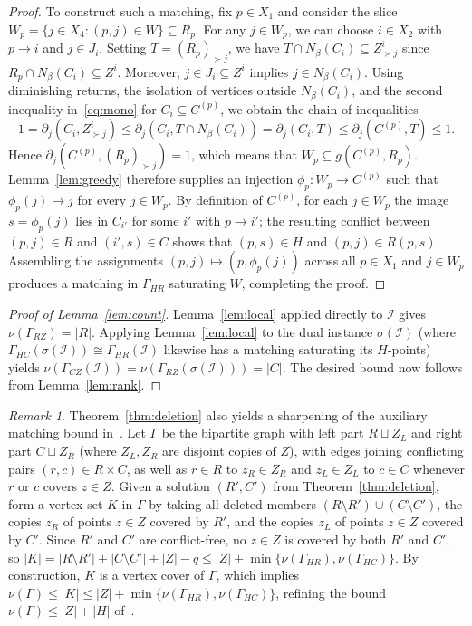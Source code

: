 \documentclass[11pt]{amsart}
\theoremstyle{remark}
\newtheorem{remark}[theorem]{Remark}
\newcommand{\abs}[1]{\lvert #1\rvert}
\begin{document}
\begin{proof}
To construct such a matching, fix $p\in X_1$ and consider the slice $W_p=\{j\in X_4:(p,j)\in W\}\subseteq R_p$. For any $j\in W_p$, we can choose $i\in X_2$ with $p\to i$ and $j\in J_i$. Setting $T=(R_p)_{\succ j}$, we have $T\cap N_\beta(C_i)\subseteq Z^i_{\succ j}$ since $R_p\cap N_\beta(C_i)\subseteq Z^i$. Moreover, $j\in J_i\subseteq Z^i$ implies $j\in N_\beta(C_i)$. Using diminishing returns, the isolation of vertices outside $N_\beta(C_i)$, and the second inequality in~\eqref{eq:mono} for $C_i\subseteq C^{(p)}$, we obtain the chain of inequalities
\[
  1=\partial_j(C_i,Z^i_{\succ j})\le\partial_j(C_i,T\cap N_\beta(C_i))
  =\partial_j(C_i,T)\le\partial_j(C^{(p)},T)\le 1.
\]
Hence $\partial_j(C^{(p)},(R_p)_{\succ j})=1$, which means that $W_p\subseteq g(C^{(p)},R_p)$. Lemma~\ref{lem:greedy} therefore supplies an injection $\phi_p\colon W_p\to C^{(p)}$ such that $\phi_p(j)\to j$ for every $j\in W_p$. By definition of $C^{(p)}$, for each $j\in W_p$ the image $s=\phi_p(j)$ lies in $C_{i'}$ for some $i'$ with $p\to i'$; the resulting conflict between $(p,j)\in R$ and $(i',s)\in C$ shows that $(p,s)\in H$ and $(p,j)\in R(p,s)$. Assembling the assignments $(p,j)\mapsto(p,\phi_p(j))$ across all $p\in X_1$ and $j\in W_p$ produces a matching in $\Gamma_{HR}$ saturating $W$, completing the proof.
\end{proof}

\begin{proof}[Proof of Lemma~\ref{lem:count}]
Lemma~\ref{lem:local} applied directly to $\mathcal I$ gives $\nu(\Gamma_{RZ})=\abs R$. Applying Lemma~\ref{lem:local} to the dual instance $\sigma(\mathcal I)$ (where $\Gamma_{HC}(\sigma(\mathcal I))\cong\Gamma_{HR}(\mathcal I)$ likewise has a matching saturating its $H$-points) yields $\nu(\Gamma_{CZ}(\mathcal I))=\nu(\Gamma_{RZ}(\sigma(\mathcal I)))=\abs C$. The desired bound now follows from Lemma~\ref{lem:rank}.
\end{proof}

\begin{remark}\label{rem:oai}
Theorem~\ref{thm:deletion} also yields a sharpening of the auxiliary matching bound in~\cite{OAI}. Let $\Gamma$ be the bipartite graph with left part $R\sqcup Z_L$ and right part $C\sqcup Z_R$ (where $Z_L,Z_R$ are disjoint copies of $Z$), with edges joining conflicting pairs $(r,c)\in R\times C$, as well as $r\in R$ to $z_R\in Z_R$ and $z_L\in Z_L$ to $c\in C$ whenever $r$ or $c$ covers $z\in Z$. Given a solution $(R',C')$ from Theorem~\ref{thm:deletion}, form a vertex set $K$ in $\Gamma$ by taking all deleted members $(R\setminus R')\cup(C\setminus C')$, the copies $z_R$ of points $z\in Z$ covered by $R'$, and the copies $z_L$ of points $z\in Z$ covered by $C'$. Since $R'$ and $C'$ are conflict-free, no $z\in Z$ is covered by both $R'$ and $C'$, so $\abs K=\abs{R\setminus R'}+\abs{C\setminus C'}+\abs Z-q\le\abs Z+\min\{\nu(\Gamma_{HR}),\nu(\Gamma_{HC})\}$. By construction, $K$ is a vertex cover of $\Gamma$, which implies $\nu(\Gamma)\le\abs K\le\abs Z+\min\{\nu(\Gamma_{HR}),\nu(\Gamma_{HC})\}$, refining the bound $\nu(\Gamma)\le\abs Z+\abs H$ of~\cite{OAI}.
\end{remark}
\end{document}
